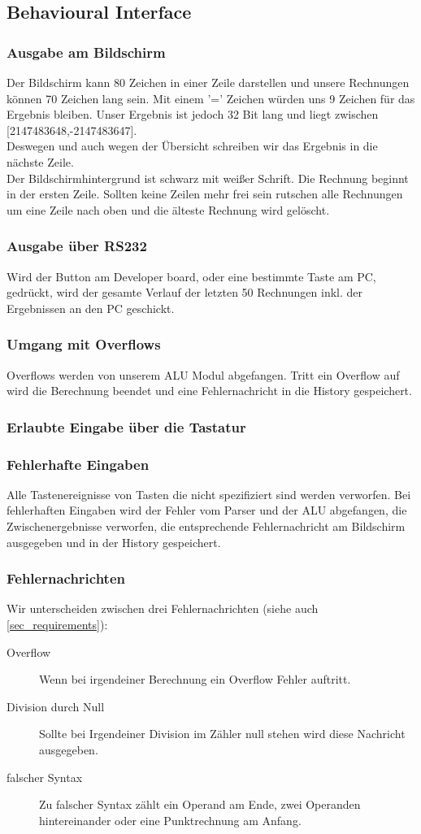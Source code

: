 \subsection{Behavioural Interface}
\subsubsection{Ausgabe am Bildschirm}
Der Bildschirm kann 80 Zeichen in einer Zeile darstellen und unsere Rechnungen können 70 Zeichen lang sein. Mit einem '=' 
Zeichen würden uns 9 Zeichen für das Ergebnis bleiben. Unser Ergebnis ist jedoch 32 Bit lang und liegt zwischen [2147483648,-2147483647].\\
Deswegen und auch wegen der Übersicht schreiben wir das Ergebnis in die nächste Zeile.\\
Der Bildschirmhintergrund ist schwarz mit weißer Schrift. Die Rechnung beginnt in der ersten Zeile. Sollten keine Zeilen mehr 
frei sein rutschen alle Rechnungen um eine Zeile nach oben und die älteste Rechnung wird gelöscht.
\subsubsection{Ausgabe über RS232}
Wird der Button am Developer board, oder eine bestimmte Taste am PC, gedrückt, wird der gesamte Verlauf der letzten 50 Rechnungen inkl. der Ergebnissen an den PC geschickt.
\subsubsection{Umgang mit Overflows}
Overflows werden von unserem ALU Modul abgefangen. Tritt ein Overflow auf wird die Berechnung beendet und eine Fehlernachricht in die History gespeichert.
\subsubsection{Erlaubte Eingabe über die Tastatur}

\subsubsection{Fehlerhafte Eingaben}
Alle Tastenereignisse von Tasten die nicht spezifiziert sind werden verworfen. Bei fehlerhaften Eingaben wird der Fehler vom Parser und der ALU abgefangen, die Zwischenergebnisse verworfen, die entsprechende Fehlernachricht am Bildschirm ausgegeben und in der History gespeichert.
\subsubsection{Fehlernachrichten}
Wir unterscheiden zwischen drei Fehlernachrichten (siehe auch \ref{sec_requirements}): 
\begin{description}
 \item[Overflow] Wenn bei irgendeiner Berechnung ein Overflow Fehler auftritt. 
 \item[Division durch Null] Sollte bei Irgendeiner Division im Zähler null stehen wird diese Nachricht ausgegeben.
 \item[falscher Syntax]Zu falscher Syntax zählt ein Operand am Ende, zwei Operanden hintereinander oder eine Punktrechnung am Anfang.
\end{description}


